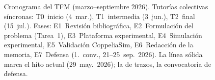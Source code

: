 \begin{figure}[htbp]
\begin{tikzpicture}[x=1.55cm, y=0.72cm]
\end{tikzpicture}
\caption[Cronograma del TFM]%
{Cronograma del TFM (marzo--septiembre 2026).
Tutorías colectivas síncronas: T0~inicio (4~mar.), T1~intermedia (3~jun.),
T2~final (15~jul.).
Fases: E1~Revisión bibliográfica, E2~Formulación del problema (Tarea~1),
E3~Plataforma experimental, E4~Simulación experimental,
E5~Validación CoppeliaSim, E6~Redacción de la memoria,
E7~Defensa (1.\textordfeminine\ conv., 21--25~sep.\ 2026).
La línea sólida marca el hito actual (29~may.\ 2026); la de trazos,
la convocatoria de defensa.}
\viuownsource
\label{fig:gantt}
\end{figure}
